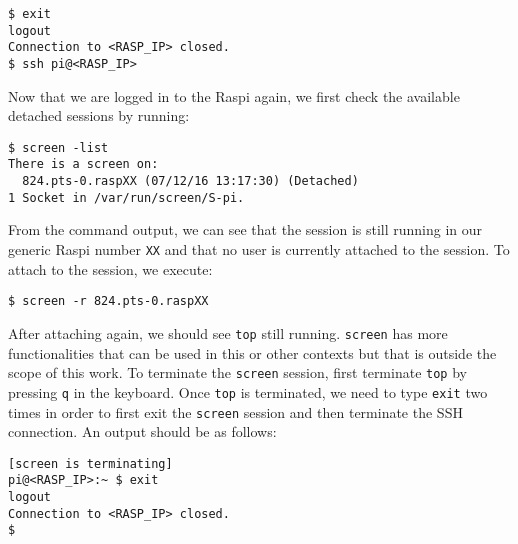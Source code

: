 \begin{lstlisting}[]
$ exit
logout
Connection to <RASP_IP> closed.
$ ssh pi@<RASP_IP>
\end{lstlisting}
\FloatBarrier
\vspace{-5mm}

Now that we are logged in to the \ac{Raspi} again, we first check the
available detached sessions by running:
\begin{lstlisting}[]
$ screen -list
There is a screen on:
  824.pts-0.raspXX (07/12/16 13:17:30) (Detached)
1 Socket in /var/run/screen/S-pi.
\end{lstlisting}
\FloatBarrier
\vspace{-5mm}

From the command output, we can see that the session is still running in our
generic \ac{Raspi} number \texttt{XX} and that no user is currently attached
to the session. To attach to the session, we execute:

\begin{lstlisting}[]
$ screen -r 824.pts-0.raspXX
\end{lstlisting}
\FloatBarrier
\vspace{-5mm}

After attaching again, we should see \texttt{top} still running.
\texttt{screen} has more functionalities that can be used in this
or other contexts but that is outside the scope of this work.
To terminate the \texttt{screen} session, first terminate \texttt{top}
by pressing \texttt{q} in the keyboard.
Once \texttt{top} is terminated,
we need to type \texttt{exit} two times in order to first exit the
\texttt{screen} session and then terminate the \ac{SSH} connection.
An output should be as follows:


\begin{lstlisting}[]
[screen is terminating]
pi@<RASP_IP>:~ $ exit
logout
Connection to <RASP_IP> closed.
$
\end{lstlisting}
\FloatBarrier
\vspace{-5mm}
